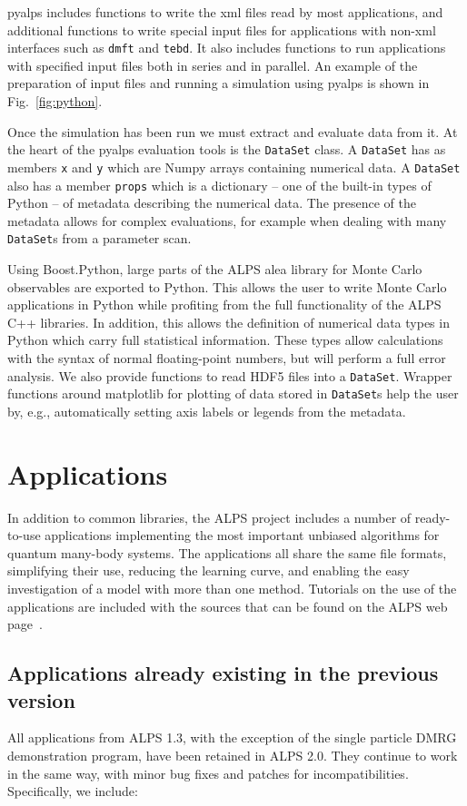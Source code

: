 \documentclass[12pt]{iopart}
\begin{document}
 pyalps includes functions to write the xml files read by most applications, and additional functions to write special input files for applications with non-xml interfaces such as {\tt dmft} and {\tt tebd}. It also includes functions to run applications with specified input files both in series and in parallel. An example of the preparation of input files and running a simulation using pyalps is shown in Fig.~\ref{fig:python}.

Once the simulation has been run we must extract and evaluate data from it. At the heart of the pyalps evaluation tools is the {\tt DataSet} class. A {\tt DataSet} has as members {\tt x} and {\tt y} which are Numpy arrays containing numerical data. A {\tt DataSet} also has a member {\tt props} which is a dictionary -- one of the built-in types of Python -- of metadata describing the numerical data. The presence of the metadata allows for complex evaluations, for example when dealing with many {\tt DataSet}s from a parameter scan.

Using Boost.Python, large parts of the ALPS alea library for Monte Carlo observables are exported to Python. This allows the user to write Monte Carlo applications in Python while profiting from the full functionality of the ALPS C++ libraries. In addition, this allows the definition of numerical data types in Python which carry full statistical information. These types allow calculations with the syntax of normal floating-point numbers, but will perform a full error analysis. We also provide functions to read HDF5 files into a {\tt DataSet}. Wrapper functions around matplotlib for plotting of data stored in {\tt DataSet}s help the user by, e.g., automatically setting axis labels or legends from the metadata.

\section{Applications}
\label{sec:applications}
In addition to common libraries, the ALPS project includes a number of ready-to-use applications implementing the most important unbiased
algorithms for quantum many-body systems. The applications all
share the same file formats, simplifying their use, reducing the
learning curve, and enabling the easy investigation of a model with
more than one method. Tutorials on the use of the applications are
included with the sources that can be found on the ALPS web
page~\cite{alps}.

\subsection{Applications already existing in the previous version}
All applications from ALPS 1.3, with the exception of the single particle DMRG demonstration program, have been retained in ALPS 2.0. They continue to work in the same way, with minor bug fixes and patches for incompatibilities. Specifically, we include:
\end{document}
